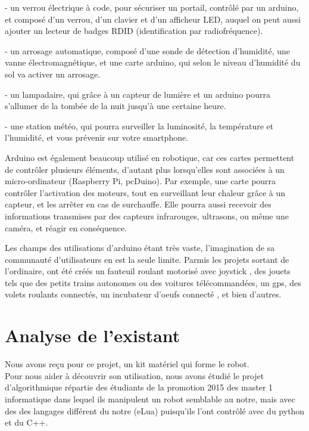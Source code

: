 \documentclass[12pt,francais]{report}
\begin{document}
- un verrou électrique à code, pour sécuriser un portail, contrôlé par un arduino, et composé d'un verrou, d'un clavier et d'un afficheur LED, auquel on peut aussi ajouter un lecteur de badges RDID (identification par radiofréquence).

- un arrosage automatique, composé d'une sonde de détection d'humidité, une vanne électromagnétique, et une carte arduino, qui selon le niveau d'humidité du sol va activer un arrosage.

- un lampadaire, qui grâce à un capteur de lumière et un arduino pourra s'allumer de la tombée de la nuit jusqu'à une certaine heure.

- une station météo, qui pourra surveiller la luminosité, la température et l'humidité, et vous prévenir sur votre smartphone.

Arduino est également beaucoup utilisé en robotique, car ces cartes permettent de contrôler plusieurs éléments, d'autant plus lorsqu'elles sont associées à un micro-ordinateur (Raspberry Pi, pcDuino). Par exemple, une carte pourra contrôler l'activation des moteurs, tout en surveillant leur chaleur grâce à un capteur, et les arrêter en cas de surchauffe. Elle pourra aussi recevoir des informations transmises par des capteurs infrarouges, ultrasons, ou même une caméra, et réagir en conséquence. \cite{ref22}

Les champs des utilisations d'arduino étant très vaste, l'imagination de sa communauté d'utilisateurs en est la seule limite. Parmis les projets sortant de l'ordinaire, ont été créés un fauteuil roulant motorisé avec joystick \cite{ref23}, des jouets tels que des petits trains autonomes ou des voitures télécommandées, un gps, des volets roulants connectés, un incubateur d'oeufs connecté \cite{ref24}, et bien d'autres.


\newpage
\section*{Analyse de l'existant}

Nous avons reçu pour ce projet, un kit matériel qui forme le robot.\\
Pour nous aider à découvrir son utilisation, nous avons étudié le projet d'algorithmique répartie des étudiants de la promotion 2015 des master 1 informatique \cite{ref1} dans lequel ils manipulent un robot semblable au notre, mais avec des des langages différent du notre (eLua) puisqu'ils l'ont contrôlé avec du python et du C++.
\end{document}
